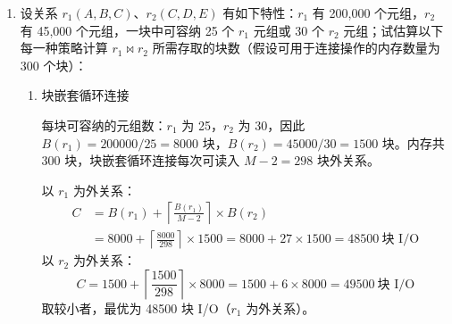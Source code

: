 \documentclass[UTF8,a4paper,11pt]{ctexart}
\newenvironment{answer}%
  {\begin{ans}\noindent{\bfseries\color{ansframe}【答案】}\hspace{0.4em}}%
  {\end{ans}}
\begin{document}
\begin{enumerate}
\begin{enumerate}
\item 计算此时的实际内存占用（按 bit 换算为 MB，$1\ \text{MB} = 8\times 10^{6}$ bit 亦可自行说明换算）。
\begin{answer}
\[
M = \frac{9.59\times 10^{7}}{8\times 10^{6}} \approx 11.98\ \text{MB}
\]
即约 12 MB（按 $1\ \text{MB}=8\times 10^{6}$ bit 换算）。
\end{answer}

\item 若内存预算被压缩到只有 2) 的一半，为保持误判率不变，可采取哪些措施？至少给出两条并简述代价。
\begin{answer}
标准布隆过滤器在 $n$、$p$ 不变时，最小位数组长度 $m$ 是确定的，仅调整 $k$ 不能把内存减半并保持原误判率，因此需从其他途径入手：\par
\textbf{措施一：减少需要存储的元素数。}例如先做分区、去重或缩小过滤集合，使每个过滤器的 $n$ 减半。代价是增加预处理、去重与分区管理成本，且需保证查询时能定位到正确分区。\par
\textbf{措施二：改用更紧凑的变体或组合结构，}如压缩布隆过滤器、分层/分块过滤器，或对冷数据降低精度要求。代价是实现复杂度提高，查询与更新开销增加，效果取决于数据分布。\par
若坚持使用标准布隆过滤器且 $n$、$p$ 不变，则无法把内存减半。
\end{answer}
\end{enumerate}

\item 设关系 $r_1(A,B,C)$、$r_2(C,D,E)$ 有如下特性：$r_1$ 有 200,000 个元组，$r_2$ 有 45,000 个元组，一块中可容纳 25 个 $r_1$ 元组或 30 个 $r_2$ 元组；试估算以下每一种策略计算 $r_1 \bowtie r_2$ 所需存取的块数（假设可用于连接操作的内存数量为 300 个块）：
\begin{enumerate}
\item 块嵌套循环连接
\begin{answer}
每块可容纳的元组数：$r_1$ 为 25，$r_2$ 为 30，因此 $B(r_1)=200000/25=8000$ 块，$B(r_2)=45000/30=1500$ 块。内存共 300 块，块嵌套循环连接每次可读入 $M-2=298$ 块外关系。\par
以 $r_1$ 为外关系：
\[
\begin{aligned}
C &= B(r_1) + \left\lceil \frac{B(r_1)}{M-2} \right\rceil \times B(r_2) \\
  &= 8000 + \left\lceil \frac{8000}{298} \right\rceil \times 1500
   = 8000 + 27\times 1500 = 48500\ \text{块 I/O}
\end{aligned}
\]
以 $r_2$ 为外关系：
\[
C = 1500 + \left\lceil \frac{1500}{298} \right\rceil \times 8000
  = 1500 + 6\times 8000 = 49500\ \text{块 I/O}
\]
取较小者，最优为 48500 块 I/O（$r_1$ 为外关系）。
\end{answer}


\end{enumerate}
\end{enumerate}
\end{document}
